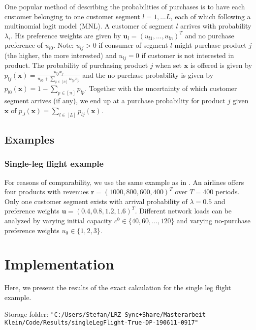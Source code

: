 One popular method of describing the probabilities of purchases is to have each customer belonging to one customer segment $l = 1, \dots L$, each of which following a multinomial logit model (MNL). A customer of segment $l$ arrives with probability $\lambda_i$. His preference weights are given by $\boldsymbol{u}_l = (u_{l1}, \dots, u_{ln})^T$ and no purchase preference of $u_{l0}$. Note: $u_{lj} > 0$ if consumer of segment $l$ might purchase product $j$ (the higher, the more interested) and $u_{lj} = 0$ if customer is not interested in product. The probability of purchasing product $j$ when set $\boldsymbol{x}$ is offered is given by $p_{lj}(\boldsymbol{x}) = \frac{u_{lj}x_j}{u_{l0} + \sum_{p\in[n]} u_{lp}x_p}$ and the no-purchase probability is given by $p_{l0}(\boldsymbol{x}) = 1 - \sum_{p\in[n]}p_{lp}$. Together with the uncertainty of which customer segment arrives (if any), we end up at a purchase probability for product $j$ given $\boldsymbol{x}$ of $p_J(\boldsymbol{x}) = \sum_{l \in [L]} p_{lj}(\boldsymbol{x})$.

\subsection{Examples}

\subsubsection{Single-leg flight example}

For reasons of comparability, we use the same example as in \cite{Koch.2017}. An airlines offers four products with revenues $\boldsymbol{r} = (1000, 800, 600, 400)^T$ over $T = 400$ periods. Only one customer segment exists with arrival probability of $\lambda = 0.5$ and preference weights $\boldsymbol{u} = (0.4, 0.8, 1.2, 1.6)^T$. Different network loads can be analyzed by varying initial capacity $c^0 \in \{40, 60, \dots, 120\}$ and varying no-purchase preference weights $u_0 \in \{1,2,3\}$.

\section{Implementation}

Here, we present the results of the exact calculation for the single leg flight example.

Storage folder: \texttt{"C:/Users/Stefan/LRZ Sync+Share/Masterarbeit-Klein/Code/Results/singleLegFlight-True-DP-190611-0917"}

